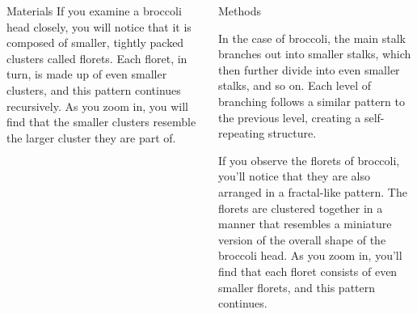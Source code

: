 \documentclass{beamer}
\begin{document}
\begin{frame}[t]
\begin{columns}[t]
\begin{column}{\twocolwid}
\begin{columns}[t,totalwidth=\twocolwid]
\begin{column}{\onecolwid}
\begin{block}{Materials}
     If you examine a broccoli head closely, you will notice that it is composed of smaller, tightly packed clusters called florets. Each floret, in turn, is made up of even smaller clusters, and this pattern continues recursively. As you zoom in, you will find that the smaller clusters resemble the larger cluster they are part of.
    
    \end{block}
    
    
    \end{column} %
        
    \begin{column}{\onecolwid}\vspace{-.6in} %
    
    
    \begin{block}{Methods}
    
    In the case of broccoli, the main stalk branches out into smaller stalks, which then further divide into even smaller stalks, and so on. Each level of branching follows a similar pattern to the previous level, creating a self-repeating structure.

If you observe the florets of broccoli, you'll notice that they are also arranged in a fractal-like pattern. The florets are clustered together in a manner that resembles a miniature version of the overall shape of the broccoli head. As you zoom in, you'll find that each floret consists of even smaller florets, and this pattern continues.

    
    \end{block}
    
    
    \end{column} %
    
    \end{columns} %
    
    

\end{column}
\end{columns}
\end{frame}
\end{document}
